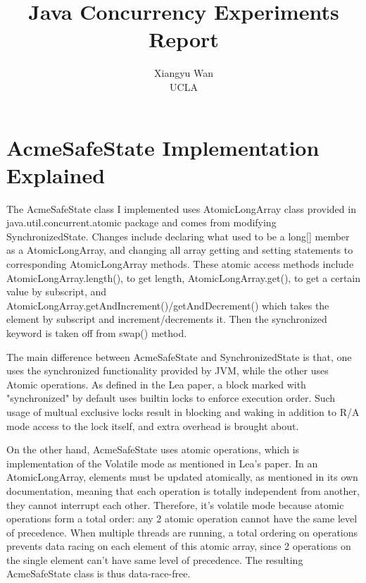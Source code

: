 \documentclass[letterpaper,twocolumn,10pt]{article}
\begin{document}

\date{}

\title{\Large \bf Java Concurrency Experiments Report}

\author{
{\rm Xiangyu Wan}\\
UCLA
} %

\maketitle


\section{AcmeSafeState Implementation Explained}

The AcmeSafeState class I implemented uses AtomicLongArray class provided in java.util.concurrent.atomic package and comes from modifying SynchronizedState. 
Changes include declaring what used to be a long[] member as a AtomicLongArray, and changing all array getting and setting statements to corresponding AtomicLongArray methods.
These atomic access methods include AtomicLongArray.length(), to get length, AtomicLongArray.get(), to get a certain value by subscript, and AtomicLongArray.getAndIncrement()/getAndDecrement() which takes the element by subscript and increment/decrements it.
Then the synchronized keyword is taken off from swap() method.

The main difference between AcmeSafeState and SynchronizedState is that, one uses the synchronized functionality provided by JVM, while the other uses Atomic operations.
As defined in the Lea paper, a block marked with "synchronized" by default uses builtin locks to enforce execution order.
Such usage of multual exclusive locks result in blocking and waking in addition to R/A mode access to the lock itself, and extra overhead is brought about.

On the other hand, AcmeSafeState uses atomic operations, which is implementation of the Volatile mode as mentioned in Lea's paper. 
In an AtomicLongArray, elements must be updated atomically, as mentioned in its own documentation, meaning that each operation is totally independent from another, they cannot interrupt each other.
Therefore, it's volatile mode because atomic operations form a total order: any 2 atomic operation cannot have the same level of precedence. 
When multiple threads are running, a total ordering on operations prevents data racing on each element of this atomic array, since 2 operations on the single element can't have same level of precedence.
The resulting AcmeSafeState class is thus data-race-free.
\end{document}
